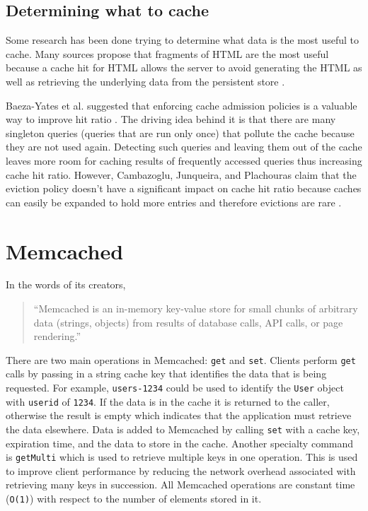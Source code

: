 \documentclass[12pt]{ucthesis}
\begin{document}
\subsection{Determining what to cache}
Some research has been done trying to determine what data is the most useful to cache.
Many sources propose that fragments of HTML are the most useful because a cache hit for HTML allows the server to avoid generating the HTML as well as retrieving the underlying data from the persistent store \cite{comparisonOfCachingSolutions, scalableConsistentCaching, howBasecampGotSoFast}.

Baeza-Yates et al. suggested that enforcing cache admission policies is a valuable way to improve hit ratio \cite{cacheAdmissionPolicies}.
The driving idea behind it is that there are many singleton queries (queries that are run only once) that pollute the cache because they are not used again.
Detecting such queries and leaving them out of the cache leaves more room for caching results of frequently accessed queries thus increasing cache hit ratio.
However, Cambazoglu, Junqueira, and Plachouras claim that the eviction policy doesn't have a significant impact on cache hit ratio because caches can easily be expanded to hold more entries and therefore evictions are rare \cite{refreshingPerspectiveSearch}.


\section{Memcached}
In the words of its creators, \begin{quotation}``Memcached is an in-memory key-value store for small chunks of arbitrary data (strings, objects) from results of database calls, API calls, or page rendering\cite{memcachedDotOrg}.''\end{quotation}
There are two main operations in \textsf{Memcached}: {\tt get} and {\tt set}.
Clients perform {\tt get} calls by passing in a string cache key that identifies the data that is being requested.
For example, {\tt users-1234} could be used to identify the {\tt User} object with {\tt userid} of {\tt 1234}.
If the data is in the cache it is returned to the caller, otherwise the result is empty which indicates that the application must retrieve the data elsewhere.
Data is added to \textsf{Memcached} by calling {\tt set} with a cache key, expiration time, and the data to store in the cache.
Another specialty command is {\tt getMulti} which is used to retrieve multiple keys in one operation.
This is used to improve client performance by reducing the network overhead associated with retrieving many keys in succession.
All \textsf{Memcached} operations are constant time ({\tt O(1)}) with respect to the number of elements stored in it.
\end{document}
